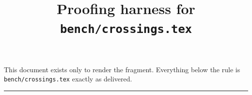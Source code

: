 \documentclass[10pt]{article}
\title{Proofing harness for \texttt{bench/crossings.tex}}
\author{}
\date{}
\begin{document}
\maketitle

\noindent
This document exists only to render the fragment. Everything below the rule is
\verb|bench/crossings.tex| exactly as delivered.

\hrule\vspace{1em}


\end{document}
